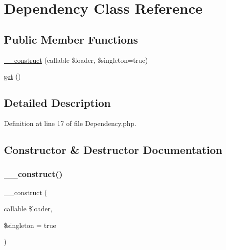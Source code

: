 \hypertarget{class_zest_1_1_common_1_1_container_1_1_dependency}{}\section{Dependency Class Reference}
\label{class_zest_1_1_common_1_1_container_1_1_dependency}
\subsection*{Public Member Functions}
\begin{DoxyCompactItemize}
\item 
\mbox{\hyperlink{class_zest_1_1_common_1_1_container_1_1_dependency_acd9319fb1aa631e2609475ec81abd759}{\+\_\+\+\_\+construct}} (callable \$loader, \$singleton=true)
\item 
\mbox{\hyperlink{class_zest_1_1_common_1_1_container_1_1_dependency_ac33ee765f5ad9f134540bac393721cfe}{get}} ()
\end{DoxyCompactItemize}


\subsection{Detailed Description}


Definition at line 17 of file Dependency.\+php.



\subsection{Constructor \& Destructor Documentation}
\mbox{\label{class_zest_1_1_common_1_1_container_1_1_dependency_acd9319fb1aa631e2609475ec81abd759}} 
\subsubsection{\texorpdfstring{\+\_\+\+\_\+construct()}{\_\_construct()}}
{\footnotesize\ttfamily \+\_\+\+\_\+construct (\begin{DoxyParamCaption}\item[{callable}]{\$loader,  }\item[{}]{\$singleton = {\ttfamily true} }\end{DoxyParamCaption})}

